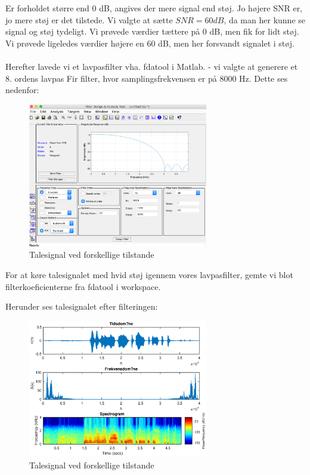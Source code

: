 \documentclass[a4paper]{report}
\begin{document}
Er forholdet større end 0 dB, angives der mere signal end støj. Jo højere SNR er, jo mere støj er det tilstede. Vi valgte at sætte $SNR=60 dB$, da man her kunne se signal og støj tydeligt. Vi prøvede værdier tættere på 0 dB, men fik for lidt støj. Vi prøvede ligeledes værdier højere en 60 dB, men her forsvandt signalet i støj.\\
\\  

Herefter lavede vi et lavpasfilter vha. fdatool i Matlab. - vi valgte at generere et 8. ordens lavpas Fir filter, hvor samplingsfrekvensen er på 8000 Hz. Dette ses nedenfor:  


\begin{figure}[H] 
\centering
\includegraphics[width=0.7\textwidth]{grafer/lavpasfilter}
\caption{Talesignal ved forskellige tilstande} \label{lavpasfilter}
\end{figure}


For at køre talesignalet med hvid støj igennem vores lavpasfilter, gemte vi blot filterkoeficienterne fra fdatool i workspace. 


Herunder ses talesignalet efter filteringen: 

\begin{figure}[H] 
\centering
\includegraphics[width=0.7\textwidth]{grafer/opg1_filter}
\caption{Talesignal ved forskellige tilstande} \label{opg1_filter}
\end{figure}
\end{document}
